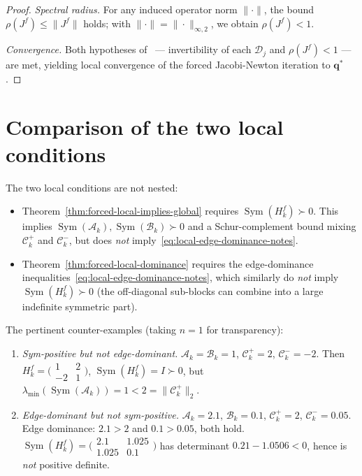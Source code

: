 \documentclass{article}
\newcommand{\Sym}{\operatorname{Sym}}
\begin{document}
\begin{proof}
    \emph{Spectral radius.} For any induced operator norm $\|\cdot\|$, the bound
    $\rho(J^f) \leq \|J^f\|$ holds; with $\|\cdot\| = \|\cdot\|_{\infty, 2}$,
    we obtain $\rho(J^f) < 1$.

    \emph{Convergence.} Both hypotheses of~\cite[Lemma~4.4]{ferraroParallelIterativeMethod2025}
    --- invertibility of each $\mathcal{D}_j$ and $\rho(J^f) < 1$ --- are met,
    yielding local convergence of the forced Jacobi-Newton iteration to
    $\mathbf{q}^*$.
\end{proof}

\section{Comparison of the two local conditions}\label{sec:comparison}

The two local conditions are not nested:

\begin{itemize}
    \item Theorem~\ref{thm:forced-local-implies-global} requires
          $\Sym(H_k^f) \succ 0$. This implies $\Sym(\mathcal{A}_k), \Sym(\mathcal{B}_k) \succ 0$
          and a Schur-complement bound mixing $\mathcal{C}^+_k$ and $\mathcal{C}^-_k$, but does
          \emph{not} imply~\eqref{eq:local-edge-dominance-notes}.

    \item Theorem~\ref{thm:forced-local-dominance} requires the edge-dominance
          inequalities~\eqref{eq:local-edge-dominance-notes}, which similarly do
          \emph{not} imply $\Sym(H_k^f) \succ 0$ (the off-diagonal sub-blocks
          can combine into a large indefinite symmetric part).
\end{itemize}

The pertinent counter-examples (taking $n = 1$ for transparency):

\begin{enumerate}
    \item \emph{Sym-positive but not edge-dominant.} $\mathcal{A}_k = \mathcal{B}_k = 1$,
          $\mathcal{C}^+_k = 2$, $\mathcal{C}^-_k = -2$. Then
          $H_k^f = \bigl(\begin{smallmatrix}1 & 2 \\ -2 & 1\end{smallmatrix}\bigr)$,
          $\Sym(H_k^f) = I \succ 0$, but $\lambda_{\min}(\Sym(\mathcal{A}_k)) = 1 < 2 = \|\mathcal{C}^+_k\|_2$.

    \item \emph{Edge-dominant but not sym-positive.}
          $\mathcal{A}_k = 2.1$, $\mathcal{B}_k = 0.1$, $\mathcal{C}^+_k = 2$, $\mathcal{C}^-_k = 0.05$.
          Edge dominance: $2.1 > 2$ and $0.1 > 0.05$, both hold.
          $\Sym(H_k^f) = \bigl(\begin{smallmatrix}2.1 & 1.025 \\ 1.025 & 0.1\end{smallmatrix}\bigr)$
          has determinant $0.21 - 1.0506 < 0$, hence is \emph{not} positive definite.
\end{enumerate}
\end{document}
